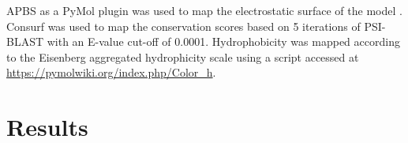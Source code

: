 
APBS as a PyMol plugin was used to map the electrostatic surface of the model \cite{Baker2001}.
Consurf \cite{Ashkenazy2010} was used to map the conservation scores based on 5 iterations of PSI-BLAST \cite{Altschul1997} with an E-value cut-off of 0.0001.
Hydrophobicity was mapped according to the Eisenberg aggregated hydrophicity scale \cite{Eisenberg1984} using a script accessed at \url{https://pymolwiki.org/index.php/Color_h}.


\section{Results}

